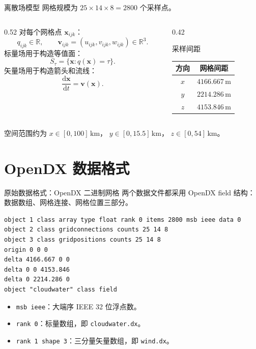 \documentclass[aspectratio=169,11pt]{ctexbeamer}
\newcommand{\R}{\mathbb R}
\newcommand{\vx}{\mathbf x}
\newcommand{\vv}{\mathbf v}
\newcommand{\dd}{\mathrm d}
\begin{document}
\begin{frame}{离散场模型}
  \small
  网格规模为 $25\times 14\times 8=2800$ 个采样点。

  \begin{columns}
    \begin{column}{0.52\linewidth}
      对每个网格点 $\vx_{ijk}$：
      \[
        q_{ijk}\in \R,\qquad
        \vv_{ijk}=(u_{ijk},v_{ijk},w_{ijk})\in \R^3 .
      \]
      标量场用于构造等值面：
      \[
        S_\tau=\{\vx:q(\vx)=\tau\}.
      \]
      矢量场用于构造箭头和流线：
      \[
        \frac{\dd \vx}{\dd t}=\vv(\vx).
      \]
    \end{column}
    \begin{column}{0.42\linewidth}
      \begin{block}{采样间距}
        \begin{tabular}{cc}
          \toprule
          方向 & 网格间距 \\
          \midrule
          $x$ & $4166.667\,\mathrm m$ \\
          $y$ & $2214.286\,\mathrm m$ \\
          $z$ & $4153.846\,\mathrm m$ \\
          \bottomrule
        \end{tabular}
      \end{block}
    \end{column}
  \end{columns}

  \vspace{0.4em}
  空间范围约为 $x\in[0,100]\,\mathrm{km}$，
  $y\in[0,15.5]\,\mathrm{km}$，
  $z\in[0,54]\,\mathrm{km}$。
\end{frame}

\section{OpenDX 数据格式}

\begin{frame}[fragile]{原始数据格式：OpenDX 二进制网格}
  \small
  两个数据文件都采用 OpenDX field 结构：数据数组、网格连接、网格位置三部分。

  \begin{Verbatim}[fontsize=\scriptsize,frame=single]
object 1 class array type float rank 0 items 2800 msb ieee data 0
object 2 class gridconnections counts 25 14 8
object 3 class gridpositions counts 25 14 8
origin 0 0 0
delta 4166.667 0 0
delta 0 0 4153.846
delta 0 2214.286 0
object "cloudwater" class field
  \end{Verbatim}

  \begin{itemize}
    \item \texttt{msb ieee}：大端序 IEEE 32 位浮点数。
    \item \texttt{rank 0}：标量数组，即 \texttt{cloudwater.dx}。
    \item \texttt{rank 1 shape 3}：三分量矢量数组，即 \texttt{wind.dx}。
  \end{itemize}
\end{frame}
\end{document}
